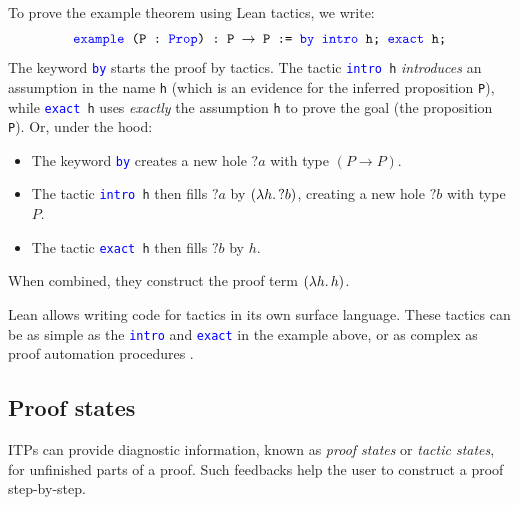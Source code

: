 \documentclass[twoside]{report}
\begin{document}
\begin{itemize}
          \begin{example}
              To prove the example theorem using Lean tactics, we write:
              $$\texttt{\textcolor{blue}{example} (P : \textcolor{blue}{Prop}) :\ P $\rightarrow$ P := \textcolor{blue}{by} \textcolor{blue}{intro} h; \textcolor{blue}{exact} h;}$$
              The keyword \texttt{\textcolor{blue}{by}} starts the proof by tactics. The tactic \texttt{\textcolor{blue}{intro} h} \emph{introduces} an assumption in the name \texttt{h} (which is an evidence for the inferred proposition \texttt{P}), while \texttt{\textcolor{blue}{exact} h} uses \emph{exactly} the assumption \texttt{h} to prove the goal (the proposition \texttt{P}). Or, under the hood:
              \begin{itemize}
                  \item The keyword \texttt{\textcolor{blue}{by}} creates a new hole ${?a}$ with type $(P \rightarrow P)$.
                  \item The tactic \texttt{\textcolor{blue}{intro} h} then fills ${?a}$ by $(\lambda{h}.\,{?b})$, creating a new hole ${?b}$ with type $P$.
                  \item The tactic \texttt{\textcolor{blue}{exact} h} then fills ${?b}$ by $h$.
              \end{itemize}
              When combined, they construct the proof term $(\lambda{h}.\,{h})$.

              Lean allows writing code for tactics in its own surface language. These tactics can be as simple as the \texttt{\textcolor{blue}{intro}} and \texttt{\textcolor{blue}{exact}} in the example above, or as complex as proof automation procedures \cite{clune2024duper}.
          \end{example}
\end{itemize}

\subsection*{Proof states}

ITPs can provide diagnostic information, known as \emph{proof states} or \emph{tactic states}, for unfinished parts of a proof. Such feedbacks help the user to construct a proof step-by-step.
\end{document}
